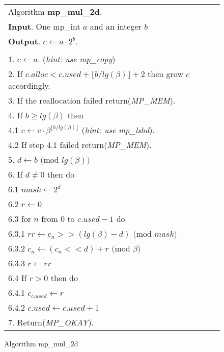\documentclass[b5paper]{book}
\begin{document}
\newpage\begin{figure}[!here]
\begin{small}
\begin{center}
\begin{tabular}{l}
\hline Algorithm \textbf{mp\_mul\_2d}. \\
\textbf{Input}.   One mp\_int $a$ and an integer $b$ \\
\textbf{Output}.  $c \leftarrow a \cdot 2^b$. \\
\hline \\
1.  $c \leftarrow a$.  (\textit{hint: use mp\_copy}) \\
2.  If $c.alloc < c.used + \lfloor b / lg(\beta) \rfloor + 2$ then grow $c$ accordingly. \\
3.  If the reallocation failed return(\textit{MP\_MEM}). \\
4.  If $b \ge lg(\beta)$ then \\
\hspace{3mm}4.1  $c \leftarrow c \cdot \beta^{\lfloor b / lg(\beta) \rfloor}$ (\textit{hint: use mp\_lshd}). \\
\hspace{3mm}4.2  If step 4.1 failed return(\textit{MP\_MEM}). \\
5.  $d \leftarrow b \mbox{ (mod }lg(\beta)\mbox{)}$ \\
6.  If $d \ne 0$ then do \\
\hspace{3mm}6.1  $mask \leftarrow 2^d$ \\
\hspace{3mm}6.2  $r \leftarrow 0$ \\
\hspace{3mm}6.3  for $n$ from $0$ to $c.used - 1$ do \\
\hspace{6mm}6.3.1  $rr \leftarrow c_n >> (lg(\beta) - d) \mbox{ (mod }mask\mbox{)}$ \\
\hspace{6mm}6.3.2  $c_n \leftarrow (c_n << d) + r \mbox{ (mod }\beta\mbox{)}$ \\
\hspace{6mm}6.3.3  $r \leftarrow rr$ \\
\hspace{3mm}6.4  If $r > 0$ then do \\
\hspace{6mm}6.4.1  $c_{c.used} \leftarrow r$ \\
\hspace{6mm}6.4.2  $c.used \leftarrow c.used + 1$ \\
7.  Return(\textit{MP\_OKAY}). \\
\hline
\end{tabular}
\end{center}
\end{small}
\caption{Algorithm mp\_mul\_2d}
\end{figure}
\end{document}
